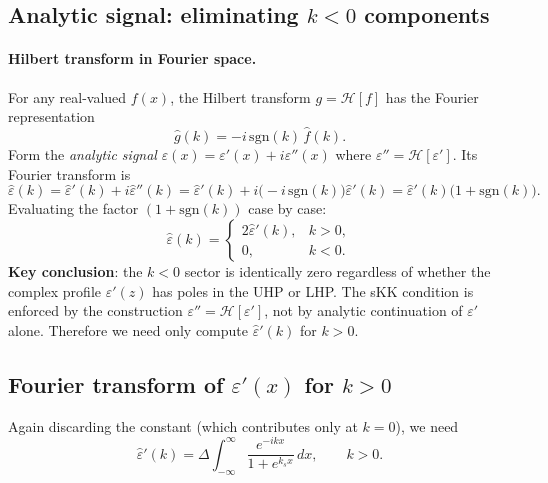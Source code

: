 \documentclass[11pt]{article}
\newcommand{\kk}{k_s}
\newcommand{\eps}{\varepsilon}
\newcommand{\epsh}{\hat{\varepsilon}}
\begin{document}
\subsection{Analytic signal: eliminating \texorpdfstring{$k<0$}{k<0} components}

\paragraph{Hilbert transform in Fourier space.}
For any real-valued $f(x)$, the Hilbert transform $g = \mathcal{H}[f]$ has the
Fourier representation
\begin{equation}
    \hat{g}(k) = -i\,\mathrm{sgn}(k)\,\hat{f}(k).
\end{equation}
Form the \emph{analytic signal} $\eps(x) = \eps'(x) + i\eps''(x)$ where
$\eps'' = \mathcal{H}[\eps']$.  Its Fourier transform is
\begin{equation}
    \epsh(k)
    = \hat{\eps}'(k) + i\hat{\eps}''(k)
    = \hat{\eps}'(k) + i\bigl(-i\,\mathrm{sgn}(k)\bigr)\hat{\eps}'(k)
    = \hat{\eps}'(k)\bigl(1 + \mathrm{sgn}(k)\bigr).
\end{equation}
Evaluating the factor $(1+\mathrm{sgn}(k))$ case by case:
\begin{equation}\label{eq:analytic_signal}
    \epsh(k) =
    \begin{cases}
        2\hat{\eps}'(k), & k > 0, \\
        0,               & k < 0.
    \end{cases}
\end{equation}
\textbf{Key conclusion}: the $k<0$ sector is identically zero regardless of whether
the complex profile $\eps'(z)$ has poles in the UHP or LHP.  The sKK condition
is enforced by the construction $\eps'' = \mathcal{H}[\eps']$, not by analytic
continuation of $\eps'$ alone.  Therefore we need only compute $\hat{\eps}'(k)$
for $k>0$.

\subsection{Fourier transform of \texorpdfstring{$\eps'(x)$}{eps'(x)} for \texorpdfstring{$k>0$}{k>0}}

Again discarding the constant (which contributes only at $k=0$), we need
\begin{equation}
    \hat{\eps}'(k) = \Delta\int_{-\infty}^{\infty}
        \frac{e^{-ikx}}{1 + e^{\kk x}}\, dx, \qquad k > 0.
\end{equation}
\end{document}
